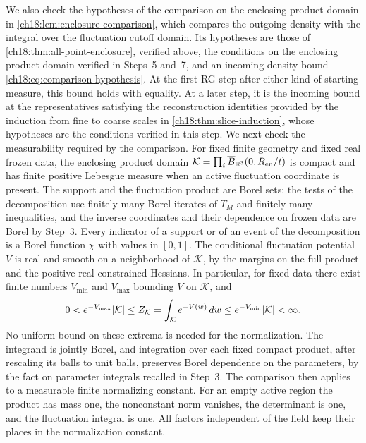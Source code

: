 We also check the hypotheses of the comparison on the enclosing product domain in \cref{ch18:lem:enclosure-comparison}, which compares the outgoing density with the integral over the fluctuation cutoff domain. Its hypotheses are those of \cref{ch18:thm:all-point-enclosure}, verified above, the conditions on the enclosing product domain verified in Steps~5 and~7, and an incoming density bound \eqref{ch18:eq:comparison-hypothesis}. At the first RG step after either kind of starting measure, this bound holds with equality. At a later step, it is the incoming bound at the representatives satisfying the reconstruction identities provided by the induction from fine to coarse scales in \cref{ch18:thm:slice-induction}, whose hypotheses are the conditions verified in this step. We next check the measurability required by the comparison. For fixed finite geometry and fixed real frozen data, the enclosing product domain $\mathcal K=\prod_i\overline B_{\mathbb R^3}(0,R_{\mathrm{en}}/t)$ is compact and has finite positive Lebesgue measure when an active fluctuation coordinate is present. The support and the fluctuation product are Borel sets: the tests of the decomposition use finitely many Borel iterates of $T_M$ and finitely many inequalities, and the inverse coordinates and their dependence on frozen data are Borel by Step~3. Every indicator of a support or of an event of the decomposition is a Borel function $\chi$ with values in $[0,1]$. The conditional fluctuation potential $V$ is real and smooth on a neighborhood of $\mathcal K$, by the margins on the full product and the positive real constrained Hessians. In particular, for fixed data there exist finite numbers $V_{\min}$ and $V_{\max}$ bounding $V$ on $\mathcal K$, and
\begin{equation}\label{ch20:eq:finite-white-normalizer}
 0<e^{-V_{\max}}\lvert \mathcal K\rvert\le Z_{\mathcal K}=\int_{\mathcal K}e^{-V(w)}\,dw\le e^{-V_{\min}}\lvert \mathcal K\rvert<\infty.
\end{equation}
No uniform bound on these extrema is needed for the normalization. The integrand is jointly Borel, and integration over each fixed compact product, after rescaling its balls to unit balls, preserves Borel dependence on the parameters, by the fact on parameter integrals recalled in Step~3. The comparison then applies to a measurable finite normalizing constant. For an empty active region the product has mass one, the nonconstant norm vanishes, the determinant is one, and the fluctuation integral is one. All factors independent of the field keep their places in the normalization constant.

